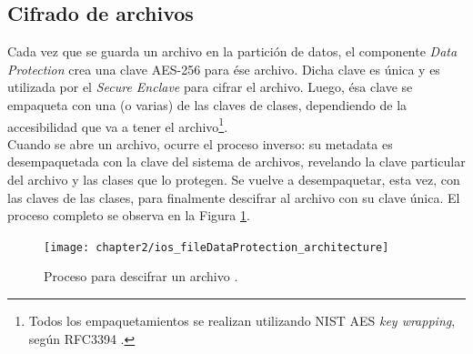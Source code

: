 \subsection{Cifrado de archivos}
Cada vez que se guarda un archivo en la partición de datos, el componente \textit{Data Protection} crea una clave AES-256 para ése archivo. Dicha clave es única y es utilizada por el \textit{Secure Enclave} para cifrar el archivo. Luego, ésa clave se empaqueta con una (o varias) de las claves de clases, dependiendo de la accesibilidad que va a tener el archivo\footnote{Todos los empaquetamientos se realizan utilizando NIST AES \textit{key wrapping}, según RFC3394 \cite{asg}.}.\\
Cuando se abre un archivo, ocurre el proceso inverso: su metadata es desempaquetada con la clave del sistema de archivos, revelando la clave particular del archivo y las clases que lo protegen. Se vuelve a desempaquetar, esta vez, con las claves de las clases, para finalmente descifrar al archivo con su clave única. El proceso completo se observa en la Figura \ref{fig:ch02:dataProtection}.
\begin{figure}[hbtp]
    \centering
    \texttt{[image: chapter2/ios\_fileDataProtection\_architecture]}
    \caption{Proceso para descifrar un archivo \cite{asg}.}
    \label{fig:ch02:dataProtection}
\end{figure}
